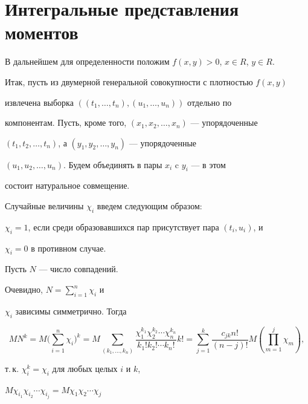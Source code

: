 \section{Интегральные представления моментов}





В дальнейшем для определенности положим $f(x,y)>0$, $x \in R$, $y \in R$.


Итак, пусть из двумерной генеральной совокупности с плотностью $f(x,y)$


извлечена выборка $((t_1, \dotsc, t_n),(u_1, \dotsc, u_n))$ отдельно по


компонентам. Пусть, кроме того, $(x_1,x_2, \dotsc, x_n)$ --- упорядоченные


$(t_1,t_2, \dotsc, t_n)$, а $(y_1,y_2, \dotsc, y_n)$ --- упорядоченные


$(u_1,u_2, \dotsc, u_n)$. Будем объединять в пары $x_i$ c $y_i$ --- в этом


состоит натуральное совмещение.





Случайные величины $\chi_i$ введем следующим образом:


$\chi_i=1$, если среди образовавшихся пар присутствует пара $(t_i,u_i)$, и


$\chi_i=0$ в противном случае.





Пусть $N$ --- число совпадений.


Очевидно, $N=\sum\limits_{i=1}^n\chi_i$ и


$\chi_i$ зависимы симметрично. Тогда


\begin{equation}


MN^k=M\bigg(\sum_{i=1}^n\chi_i\bigg)^k=


M\sum_{(k_1,\dotsc,k_n)}\frac{\chi_1^{k_1}\chi_2^{k_2}


\dotsb \chi_n^{k_n}}{k_1!k_2! \dotsb k_n!}k! =


\sum_{j=1}^k \frac{c_{jk} n!}{(n-j)!}


M(\prod_{m=1}^j\chi_m),


\end{equation}


т.\,к. $\chi_i^k=\chi_i$ для любых целых $i$ и $k$,


$M\chi_{i_1}\chi_{i_2}\dotsb \chi_{i_j}=M\chi_{1}\chi_{2}\dotsb \chi_{j}$


